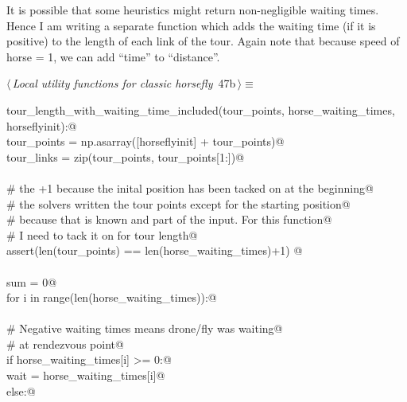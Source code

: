 \documentclass[11.5pt]{report}
\begin{document}
\vspace{-0.8cm}\newchunk It is possible that some heuristics might return non-negligible
      waiting times. Hence I am writing a separate function which
      adds the waiting time (if it is positive) to the length of 
      each link of the tour. Again note that because 
      speed of horse = 1, we can add ``time'' to ``distance''. 

\begin{flushleft} \small\label{scrap72}\raggedright\small
{} $\langle\,${\itshape Local utility functions for classic horsefly}\nobreak\ {\footnotesize {47b}}$\,\rangle\equiv$
\vspace{-1ex}
\begin{list}{}{} \item
\mbox{}\verb@def tour_length_with_waiting_time_included(tour_points, horse_waiting_times, horseflyinit):@\\
\mbox{}\verb@      tour_points   = np.asarray([horseflyinit] + tour_points)@\\
\mbox{}\verb@      tour_links    = zip(tour_points, tour_points[1:])@\\
\mbox{}\verb@@\\
\mbox{}\verb@      # the +1 because the inital position has been tacked on at the beginning@\\
\mbox{}\verb@      # the solvers written the tour points except for the starting position@\\
\mbox{}\verb@      # because that is known and part of the input. For this function@\\
\mbox{}\verb@      # I need to tack it on for tour length@\\
\mbox{}\verb@      assert(len(tour_points) == len(horse_waiting_times)+1) @\\
\mbox{}\verb@@\\
\mbox{}\verb@      sum = 0@\\
\mbox{}\verb@      for i in range(len(horse_waiting_times)):@\\
\mbox{}\verb@@\\
\mbox{}\verb@          # Negative waiting times means drone/fly was waiting@\\
\mbox{}\verb@          # at rendezvous point@\\
\mbox{}\verb@          if horse_waiting_times[i] >= 0:@\\
\mbox{}\verb@              wait = horse_waiting_times[i]@\\
\mbox{}\verb@          else:@\\

\end{list}
\end{flushleft}
\end{document}
